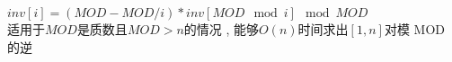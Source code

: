 ﻿$ inv[i] = ( MOD - MOD / i ) * inv[MOD \mod i] \mod MOD $ \\
适用于$ MOD $是质数且$ MOD > n $的情况 , 能够$ O(n) $时间求出$ [1, n] $对模 MOD 的逆
